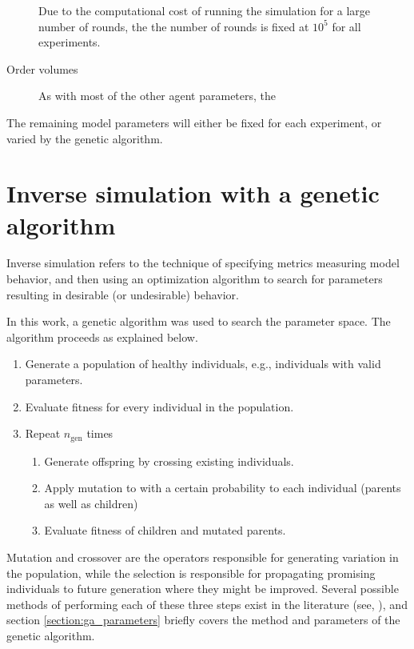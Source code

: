 \begin{description}
	\item [\nrounds] Due to the computational cost of running the simulation for a large number of rounds, the the number of rounds is fixed at $10^5$ for all experiments.
	\item [Order volumes] As with most of the other agent parameters, the 
\end{description}

The remaining model parameters will either be fixed for each experiment, or varied by the genetic algorithm. 





\section{Inverse simulation with a genetic algorithm}\label{section:genetic_algorithm}
Inverse simulation refers to the technique of specifying metrics measuring model behavior, and then using an optimization algorithm to search for parameters resulting in desirable (or undesirable) behavior. 

In this work, a genetic algorithm was used to search the parameter space. The algorithm proceeds as explained below.
\begin{enumerate}
	\item Generate a population of healthy individuals, e.g., individuals with valid parameters.
	\item Evaluate fitness for every individual in the population.
	\item Repeat $n_\text{gen}$ times 
	\begin{enumerate}
		\item Generate offspring by crossing existing individuals.
		\item Apply mutation to with a certain probability to each individual (parents as well as children)
		\item Evaluate fitness of children and mutated parents.
	\end{enumerate}
\end{enumerate}

Mutation and crossover are the operators responsible for generating variation in the population, while the selection is responsible for propagating promising individuals to future generation where they might be improved. Several possible methods of performing each of these three steps exist in the literature (see\cite{genetic1}, \cite{genetic2}), and section \ref{section:ga_parameters} briefly covers the method and parameters of the genetic algorithm.

